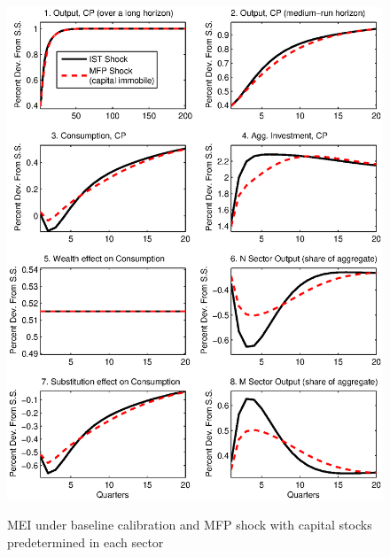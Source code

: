 \documentclass[12pt,fleqn]{article}
\begin{document}
{%
\clearpage
\begin{figure}[tbp] \center
\caption{MEI under baseline calibration and MFP shock with capital
stocks predetermined in each sector}
\label{figure_b1}{\normalsize \center %
}
\par
{\normalsize \includegraphics[scale=0.8]{figure_b1.ps}  }
\footnotesize \flushleft
{}
\end{figure}
}
\end{document}
